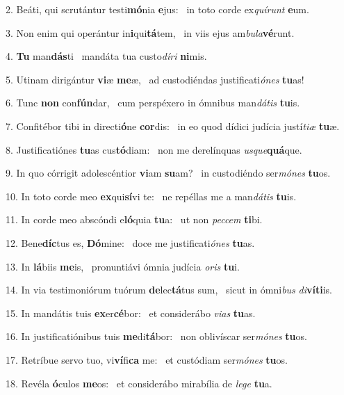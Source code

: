 2. Beáti, qui scrutántur testi\textbf{mó}nia \textbf{e}jus: \ast\  in toto corde ex\textit{quí}\textit{runt} \textbf{e}um.\

3. Non enim qui operántur in\textbf{i}qui\textbf{tá}tem, \ast\  in viis ejus am\textit{bu}\textit{la}\textbf{vé}runt.\

4. \textbf{Tu} man\textbf{dás}ti \ast\  mandáta tua custo\textit{dí}\textit{ri} \textbf{ni}mis.\

5. Utinam dirigántur \textbf{vi}æ \textbf{me}æ, \ast\  ad custodiéndas justificati\textit{ó}\textit{nes} \textbf{tu}as!\

6. Tunc \textbf{non} con\textbf{fún}dar, \ast\  cum perspéxero in ómnibus man\textit{dá}\textit{tis} \textbf{tu}is.\

7. Confitébor tibi in directi\textbf{ó}ne \textbf{cor}dis: \ast\  in eo quod dídici judícia justí\textit{ti}\textit{æ} \textbf{tu}æ.\

8. Justificatiónes \textbf{tu}as cus\textbf{tó}diam: \ast\  non me derelínquas \textit{us}\textit{que}\textbf{quá}que.\

9. In quo córrigit adolescéntior \textbf{vi}am \textbf{su}am? \ast\  in custodiéndo ser\textit{mó}\textit{nes} \textbf{tu}os.\

10. In toto corde meo \textbf{ex}qui\textbf{sí}vi te: \ast\  ne repéllas me a man\textit{dá}\textit{tis} \textbf{tu}is.\

11. In corde meo abscóndi e\textbf{ló}quia \textbf{tu}a: \ast\  ut non \textit{pec}\textit{cem} \textbf{ti}bi.\

12. Bene\textbf{díc}tus es, \textbf{Dó}mine: \ast\  doce me justificati\textit{ó}\textit{nes} \textbf{tu}as.\

13. In \textbf{lá}biis \textbf{me}is, \ast\  pronuntiávi ómnia judícia \textit{o}\textit{ris} \textbf{tu}i.\

14. In via testimoniórum tuórum \textbf{de}lec\textbf{tá}tus sum, \ast\  sicut in ómni\textit{bus} \textit{di}\textbf{ví}\textbf{ti}is.\

15. In mandátis tuis \textbf{ex}er\textbf{cé}bor: \ast\  et considerábo \textit{vi}\textit{as} \textbf{tu}as.\

16. In justificatiónibus tuis \textbf{me}di\textbf{tá}bor: \ast\  non oblivíscar ser\textit{mó}\textit{nes} \textbf{tu}os.\

17. Retríbue servo tuo, vi\textbf{ví}fi\textbf{ca} me: \ast\  et custódiam ser\textit{mó}\textit{nes} \textbf{tu}os.\

18. Revéla \textbf{ó}culos \textbf{me}os: \ast\  et considerábo mirabília de \textit{le}\textit{ge} \textbf{tu}a.\

